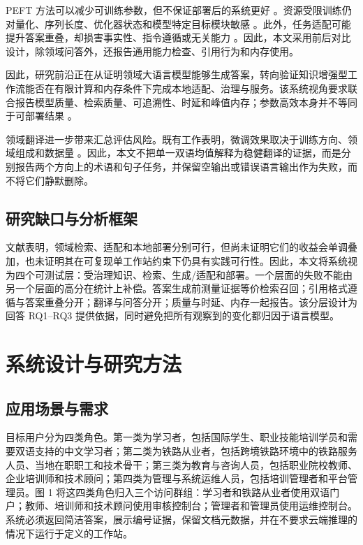 PEFT 方法可以减少可训练参数，但不保证部署后的系统更好 \citep{ding2023peft,wang2025peft}。资源受限训练仍对量化、序列长度、优化器状态和模型特定目标模块敏感 \citep{lv2024full}。此外，任务适配可能提升答案重叠，却损害事实性、指令遵循或无关能力 \citep{tian2024factuality,barnett2024finetuning}。因此，本文采用前后对比设计，除领域问答外，还报告通用能力检查、引用行为和内存使用。

因此，研究前沿正在从证明领域大语言模型能够生成答案，转向验证知识增强型工作流能否在有限计算和内存条件下完成本地适配、治理与服务。该系统视角要求联合报告模型质量、检索质量、可追溯性、时延和峰值内存；参数高效本身并不等同于可部署结果 \citep{ding2023peft,lv2024full,wang2025peft}。

领域翻译进一步带来汇总评估风险。既有工作表明，微调效果取决于训练方向、领域组成和数据量 \citep{hu2024translation,vieira2024translation,zheng2024translation}。因此，本文不把单一双语均值解释为稳健翻译的证据，而是分别报告两个方向上的术语和句子任务，并保留空输出或错误语言输出作为失败，而不将它们静默删除。

\subsection{研究缺口与分析框架}

文献表明，领域检索、适配和本地部署分别可行，但尚未证明它们的收益会单调叠加，也未证明其在可复现单工作站约束下仍具有实践可行性。因此，本文将系统视为四个可测试层：受治理知识、检索、生成/适配和部署。一个层面的失败不能由另一个层面的高分在统计上补偿。答案生成前测量证据等价检索召回；引用格式遵循与答案重叠分开；翻译与问答分开；质量与时延、内存一起报告。该分层设计为回答 RQ1--RQ3 提供依据，同时避免把所有观察到的变化都归因于语言模型。

\section{系统设计与研究方法}

\subsection{应用场景与需求}

目标用户分为四类角色。第一类为学习者，包括国际学生、职业技能培训学员和需要双语支持的中文学习者；第二类为铁路从业者，包括跨境铁路环境中的铁路服务人员、当地在职职工和技术骨干；第三类为教育与咨询人员，包括职业院校教师、企业培训师和技术顾问；第四类为管理与系统运维人员，包括培训管理者和平台管理员。图 1 将这四类角色归入三个访问群组：学习者和铁路从业者使用双语门户；教师、培训师和技术顾问使用审核控制台；管理者和管理员使用运维控制台。系统必须返回简洁答案，展示编号证据，保留文档元数据，并在不要求云端推理的情况下运行于定义的工作站。

